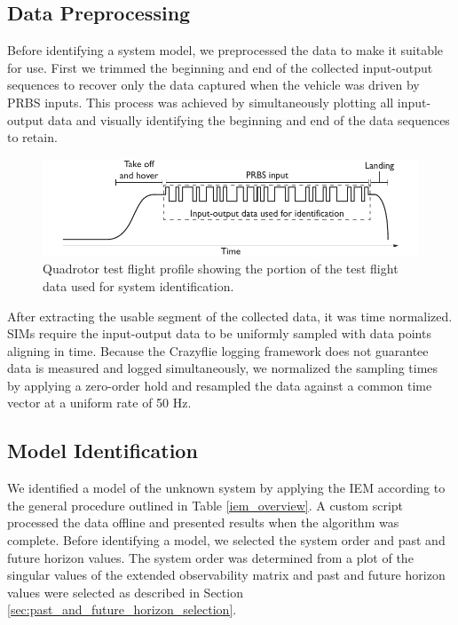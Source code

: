 \subsection{Data Preprocessing}
Before identifying a system model, we preprocessed the data to make it suitable for use. First we trimmed the beginning and end of the collected input-output sequences to recover only the data captured when the vehicle was driven by PRBS inputs. This process was achieved by simultaneously plotting all input-output data and visually identifying the beginning and end of the data sequences to retain.
\begin{figure}[htb!]
	\centering
	\includegraphics{../fig/test_flight_profile.pdf}
	\caption{Quadrotor test flight profile showing the portion of the test flight data used for system identification.}
	\label{fig:test_flight_profile}
\end{figure}

After extracting the usable segment of the collected data, it was time normalized. SIMs require the input-output data to be uniformly sampled with data points aligning in time. Because the Crazyflie logging framework does not guarantee data is measured and logged simultaneously, we normalized the sampling times by applying a zero-order hold and resampled the data against a common time vector at a uniform rate of 50 Hz.


\subsection{Model Identification}
We identified a model of the unknown system by applying the IEM according to the general procedure outlined in Table \ref{iem_overview}. A custom \matlab script processed the data offline and presented results when the algorithm was complete. Before identifying a model, we selected the system order and past and future horizon values. The system order was determined from a plot of the singular values of the extended observability matrix and past and future horizon values were selected as described in Section \ref{sec:past_and_future_horizon_selection}.

